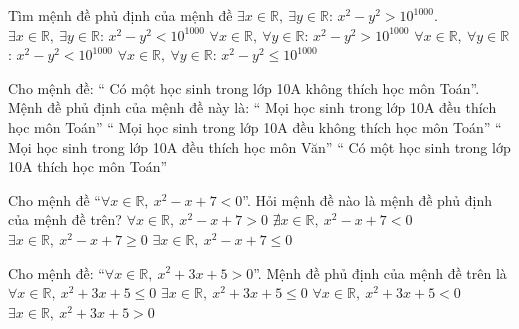 \begin{ex}%
	 Tìm mệnh đề phủ định của mệnh đề
	 $\exists x \in \mathbb{R},\ \exists y \in \mathbb{R} $: $x^2-y^2 > 10^{1000}$.
	\choice 
		{$\exists x  \in \mathbb{R},\ \exists y \in \mathbb{R} $: $x^2-y^2 < 10^{1000}$}
		{$\forall x \in \mathbb{R},\ \forall y  \in \mathbb{R} $: $x^2-y^2 > 10^{1000}$}
		{$\forall x \in \mathbb{R},\ \forall y \in \mathbb{R} $: $x^2-y^2  < 10^{1000}$}
		{\True  $\forall x \in \mathbb{R},\ \forall y \in \mathbb{R} $: $x^2-y^2 \leq 10^{1000}$}
\end{ex}

\begin{ex}%
	Cho mệnh đề: “ Có một học sinh trong lớp 10A không thích học môn Toán”. Mệnh đề phủ định của mệnh đề này  là:
	\choice 
		{\True “ Mọi học sinh trong lớp 10A đều thích học môn  Toán”}
		{“ Mọi học sinh trong lớp 10A đều không thích học môn  Toán”}
		{“ Mọi học sinh  trong lớp 10A đều thích học môn Văn”}
		{“ Có  một học sinh trong lớp 10A thích học môn Toán”}
\end{ex}

\begin{ex}%
	Cho mệnh đề “$\forall x\in \mathbb{R}, \ x^2-x+7<0$”. Hỏi mệnh đề  nào là mệnh đề phủ định của mệnh đề trên?
	\choice 
		 {$\forall x\in \mathbb{R}, \ x^2-x+7>0$}
		{$ \nexists  x \in \mathbb{R}, \ x^2-x+7<0$}
		{\True $\exists x\in \mathbb{R}, \  x^2-x+7\geqslant 0$}
		{$\exists  x\in \mathbb{R}, \ x^2-x+7\leqslant 0$}
\end{ex}

\begin{ex}%
	Cho mệnh đề: “$\forall x\in \mathbb{R},\ x^2+3x+5>0$”. Mệnh đề phủ định của mệnh đề trên là 
	\choice 
		{$\forall  x\in \mathbb{R}, \ x^2+3x+5\leqslant 0$ }
		{\True $\exists x\in \mathbb{R},\ x^2+3x+5\leqslant  0$}
		{$\forall x\in \mathbb{R},  \ x^2+3x+5<0$ }
		{$\exists x\in \mathbb{R},  \ x^2+3x+5>0$ }
\end{ex}


